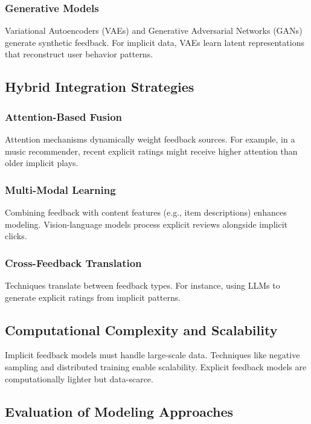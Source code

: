 \subsubsection{Generative Models}

Variational Autoencoders (VAEs) and Generative Adversarial Networks (GANs) generate synthetic feedback. For implicit data, VAEs learn latent representations that reconstruct user behavior patterns.

\subsection{Hybrid Integration Strategies}

\subsubsection{Attention-Based Fusion}

Attention mechanisms dynamically weight feedback sources. For example, in a music recommender, recent explicit ratings might receive higher attention than older implicit plays.

\subsubsection{Multi-Modal Learning}

Combining feedback with content features (e.g., item descriptions) enhances modeling. Vision-language models process explicit reviews alongside implicit clicks.

\subsubsection{Cross-Feedback Translation}

Techniques translate between feedback types. For instance, using LLMs to generate explicit ratings from implicit patterns.

\subsection{Computational Complexity and Scalability}

Implicit feedback models must handle large-scale data. Techniques like negative sampling and distributed training enable scalability. Explicit feedback models are computationally lighter but data-scarce.

\subsection{Evaluation of Modeling Approaches}

